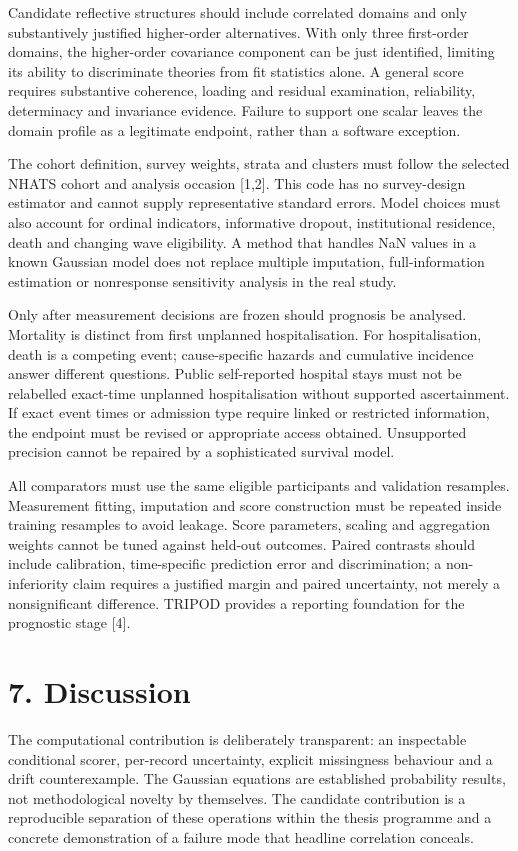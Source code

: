 \documentclass[11pt,a4paper]{article}
\begin{document}
Candidate reflective structures should include correlated domains and only substantively justified higher-order alternatives. With only three first-order domains, the higher-order covariance component can be just identified, limiting its ability to discriminate theories from fit statistics alone. A general score requires substantive coherence, loading and residual examination, reliability, determinacy and invariance evidence. Failure to support one scalar leaves the domain profile as a legitimate endpoint, rather than a software exception.

The cohort definition, survey weights, strata and clusters must follow the selected NHATS cohort and analysis occasion [1,2]. This code has no survey-design estimator and cannot supply representative standard errors. Model choices must also account for ordinal indicators, informative dropout, institutional residence, death and changing wave eligibility. A method that handles NaN values in a known Gaussian model does not replace multiple imputation, full-information estimation or nonresponse sensitivity analysis in the real study.

Only after measurement decisions are frozen should prognosis be analysed. Mortality is distinct from first unplanned hospitalisation. For hospitalisation, death is a competing event; cause-specific hazards and cumulative incidence answer different questions. Public self-reported hospital stays must not be relabelled exact-time unplanned hospitalisation without supported ascertainment. If exact event times or admission type require linked or restricted information, the endpoint must be revised or appropriate access obtained. Unsupported precision cannot be repaired by a sophisticated survival model.

All comparators must use the same eligible participants and validation resamples. Measurement fitting, imputation and score construction must be repeated inside training resamples to avoid leakage. Score parameters, scaling and aggregation weights cannot be tuned against held-out outcomes. Paired contrasts should include calibration, time-specific prediction error and discrimination; a non-inferiority claim requires a justified margin and paired uncertainty, not merely a nonsignificant difference. TRIPOD provides a reporting foundation for the prognostic stage [4].

\section*{7. Discussion}
The computational contribution is deliberately transparent: an inspectable conditional scorer, per-record uncertainty, explicit missingness behaviour and a drift counterexample. The Gaussian equations are established probability results, not methodological novelty by themselves. The candidate contribution is a reproducible separation of these operations within the thesis programme and a concrete demonstration of a failure mode that headline correlation conceals.
\end{document}
